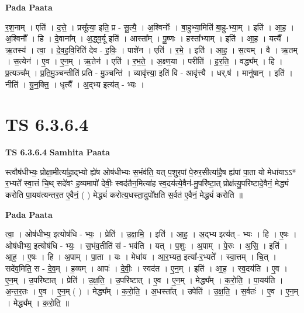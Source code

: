 \documentclass[17pt]{extarticle}
\begin{document}
\textbf{Pada Paata} \newline

र॒श॒नाम् । एति॑ । द॒त्ते॒ । प्रसू᳚त्या॒ इति॒ प्र - सू॒त्यै॒ । अ॒श्विनोः᳚ । बा॒हुभ्या॒मिति॑ बा॒हु-भ्या॒म् । इति॑ । आ॒ह॒ । अ॒श्विनौ᳚ । हि । दे॒वाना᳚म् । अ॒द्ध्व॒र्यू इति॑ । आस्ता᳚म् । पू॒ष्णः । हस्ता᳚भ्याम् । इति॑ । आ॒ह॒ । यत्यै᳚ । ऋ॒तस्य॑ । त्वा॒ । दे॒व॒ह॒वि॒रिति॑ देव - ह॒विः॒ । पाशे॑न । एति॑ । र॒भे॒ । इति॑ । आ॒ह॒ । स॒त्यम् । वै । ऋ॒तम् । स॒त्येन॑ । ए॒व । ए॒न॒म् । ऋ॒तेन॑ । एति॑ । र॒भ॒ते॒ । अ॒क्ष्ण॒या । परीति॑ । ह॒र॒ति॒ । वद्ध्य᳚म् । हि । प्र॒त्यञ्च᳚म् । प्र॒ति॒मु॒ञ्चन्तीति॑ प्रति - मु॒ञ्चन्ति॑ । व्यावृ॑त्त्या॒ इति॑ वि - आवृ॑त्त्यै । धर्.ष॑ । मानु॑षान् । इति॑ । नीति॑ । यु॒न॒क्ति॒ । धृत्यै᳚ । अ॒द्भ्य इत्य॑त् - भ्यः ।  \newline





\section{ TS 6.3.6.4 }

\textbf{TS 6.3.6.4 } \newline
\textbf{Samhita Paata} \newline

स्त्वौष॑धीभ्यः॒ प्रोक्षा॒मीत्या॑हा॒द्भ्यो ह्ये॑ष ओष॑धीभ्यः स॒भंव॑ति॒ यत् प॒शुर॒पां पे॒रुर॒सीत्या॑है॒ष ह्य॑पां पा॒ता यो मेधा॑याऽऽ* र॒भ्यते᳚ स्वा॒त्तं चि॒थ् सदे॑वꣳ ह॒व्यमापो॑ देवीः॒ स्वद॑तैन॒मित्या॑ह स्व॒दय॑त्ये॒वैन॑-मु॒परि॑ष्टा॒त् प्रोक्ष॑त्यु॒परि॑ष्टादे॒वैनं॒ मेद्ध्यं॑ करोति पा॒यय॑त्यन्तर॒त ए॒वैनं॒ ( ) मेद्ध्यं॑ करोत्य॒धस्ता॒दुपो᳚क्षति स॒र्वत॑ ए॒वैनं॒ मेद्ध्यं॑ करोति ॥ \newline

\textbf{Pada Paata} \newline

त्वा॒ । ओष॑धीभ्य॒ इत्योष॑धि - भ्यः॒ । प्रेति॑ । उ॒क्षा॒मि॒ । इति॑ । आ॒ह॒ । अ॒द्भ्य इत्य॑त् - भ्यः । हि । ए॒षः । ओष॑धीभ्य॒ इत्योष॑धि - भ्यः॒ । स॒भंव॒तीति॑ सं - भव॑ति । यत् । प॒शुः । अ॒पाम् । पे॒रुः । अ॒सि॒ । इति॑ । आ॒ह॒ । ए॒षः । हि । अ॒पाम् । पा॒ता । यः । मेधा॑य । आ॒र॒भ्यत॒ इत्या᳚-र॒भ्यते᳚ । स्वा॒त्तम् । चि॒त् । सदे॑व॒मिति॒ स - दे॒व॒म् । ह॒व्यम् । आपः॑ । दे॒वीः॒ । स्वद॑त । ए॒न॒म् । इति॑ । आ॒ह॒ । स्व॒दय॑ति । ए॒व । ए॒न॒म् । उ॒परि॑ष्टात् । प्रेति॑ । उ॒क्ष॒ति॒ । उ॒परि॑ष्टात् । ए॒व । ए॒न॒म् । मेद्ध्य᳚म् । क॒रो॒ति॒ । पा॒यय॑ति । अ॒न्त॒र॒तः । ए॒व । ए॒न॒म् ( ) । मेद्ध्य᳚म् । क॒रो॒ति॒ । अ॒धस्ता᳚त् । उपेति॑ । उ॒क्ष॒ति॒ । स॒र्वतः॑ । ए॒व । ए॒न॒म् । मेद्ध्य᳚म् । क॒रो॒ति॒ ॥  \newline
\end{document}
